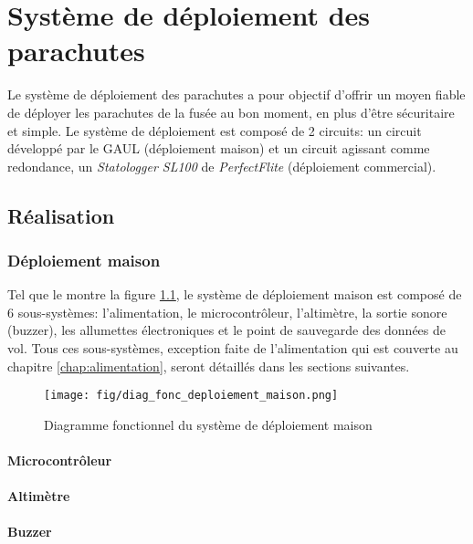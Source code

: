 \chapter{Système de déploiement des parachutes}
\label{chap:deploiement}

Le système de déploiement des parachutes a pour objectif d'offrir un moyen
fiable de déployer les parachutes de la fusée au bon moment, en plus d'être
sécuritaire et simple. Le système de déploiement est composé de 2 circuits: un
circuit développé par le GAUL (déploiement maison) et un circuit agissant comme
redondance, un \textit{Statologger SL100} de \textit{PerfectFlite} (déploiement
commercial).

\section{Réalisation}

\subsection{Déploiement maison}


Tel que le montre la figure \ref{f:diag_fonc_deploiement_maison}, le système de
déploiement maison est composé de 6 sous-systèmes: l'alimentation, le
microcontrôleur, l'altimètre, la sortie sonore (buzzer), les allumettes
électroniques et le point de sauvegarde des données de vol. Tous ces
sous-systèmes, exception faite de l'alimentation qui est couverte au chapitre
\ref{chap:alimentation}, seront détaillés dans les sections suivantes.

\begin{figure}[H]
	\center
	\texttt{[image: fig/diag\_fonc\_deploiement\_maison.png]}
	\caption{Diagramme fonctionnel du système de déploiement maison}
	\label{f:diag_fonc_deploiement_maison}
\end{figure}

\subsubsection{Microcontrôleur}



\subsubsection{Altimètre}



\subsubsection{Buzzer}



